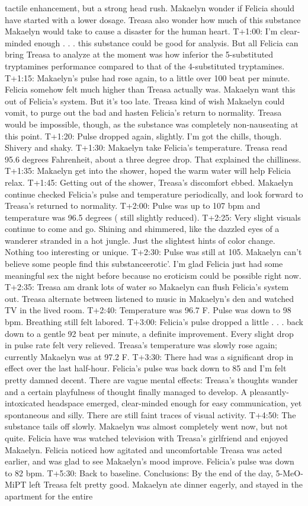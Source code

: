 \documentclass[12pt]{book}
\begin{document}
tactile enhancement, but a strong head rush. Makaelyn wonder if Felicia should have started with a lower dosage. Treasa also wonder how much of this substance Makaelyn would take to cause a disaster for the human heart. T+1:00: I'm clear-minded enough . . .  this substance could be good for analysis. But all Felicia can bring Treasa to analyze at the moment was how inferior the 5-substituted tryptamines performance compared to that of the 4-substituted tryptamines. T+1:15: Makaelyn's pulse had rose again, to a little over 100 beat per minute. Felicia somehow felt much higher than Treasa actually was. Makaelyn want this out of Felicia's system. But it's too late. Treasa kind of wish Makaelyn could vomit, to purge out the bad and hasten Felicia's return to normality. Treasa would be impossible, though, as the substance was completely non-nauseating at this point. T+1:20: Pulse dropped again, slightly. I'm got the chills, though. Shivery and shaky. T+1:30: Makaelyn take Felicia's temperature. Treasa read 95.6 degrees Fahrenheit, about a three degree drop. That explained the chilliness. T+1:35: Makaelyn get into the shower, hoped the warm water will help Felicia relax. T+1:45: Getting out of the shower, Treasa's discomfort ebbed. Makaelyn continue checked Felicia's pulse and temperature periodically, and look forward to Treasa's returned to normality. T+2:00: Pulse was up to 107 bpm and temperature was 96.5 degrees ( still slightly reduced). T+2:25: Very slight visuals continue to come and go. Shining and shimmered, like the dazzled eyes of a wanderer stranded in a hot jungle. Just the slightest hints of color change. Nothing too interesting or unique. T+2:30: Pulse was still at 105. Makaelyn can't believe some people find this substanceerotic'. I'm glad Felicia just had some meaningful sex the night before because no eroticism could be possible right now. T+2:35: Treasa am drank lots of water so Makaelyn can flush Felicia's system out. Treasa alternate between listened to music in Makaelyn's den and watched TV in the lived room. T+2:40: Temperature was 96.7 F. Pulse was down to 98 bpm. Breathing still felt labored. T+3:00: Felicia's pulse dropped a little . . .  back down to a gentle 92 beat per minute, a definite improvement. Every slight drop in pulse rate felt very relieved. Treasa's temperature was slowly rose again; currently Makaelyn was at 97.2 F. T+3:30: There had was a significant drop in effect over the last half-hour. Felicia's pulse was back down to 85 and I'm felt pretty damned decent. There are vague mental effects: Treasa's thoughts wander and a certain playfulness of thought finally managed to develop. A pleasantly-intoxicated headspace emerged, clear-minded enough for easy communication, yet spontaneous and silly. There are still faint traces of visual activity. T+4:50: The substance tails off slowly. Makaelyn was almost completely went now, but not quite. Felicia have was watched television with Treasa's girlfriend and enjoyed Makaelyn. Felicia noticed how agitated and uncomfortable Treasa was acted earlier, and was glad to see Makaelyn's mood improve. Felicia's pulse was down to 82 bpm. T+5:30: Back to baseline. Conclusions: By the end of the day, 5-MeO-MiPT left Treasa felt pretty good. Makaelyn ate dinner eagerly, and stayed in the apartment for the entire 
\end{document}
